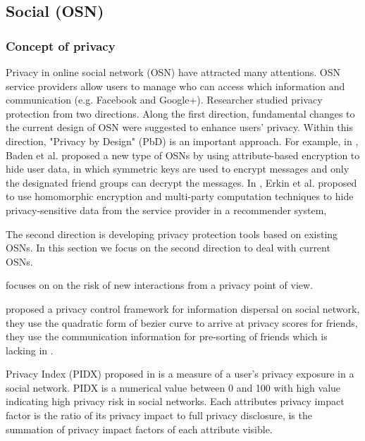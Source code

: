 \subsection{Social (OSN)}

\subsubsection{Concept of privacy}

Privacy in online social network (OSN) have attracted many attentions.
OSN service providers allow users to manage who can access which information and communication (e.g. Facebook and Google+).
Researcher studied privacy protection from two directions.
Along the first direction,
	fundamental changes to the current design of OSN were suggested to enhance users' privacy.
Within this direction, "Privacy by Design" (PbD) is an important approach.
For example,
	in \cite{baden_persona:_2009},
	Baden et al. proposed a new type of OSNs by using attribute-based encryption to hide user data,
	in which symmetric keys are used to encrypt messages and only the designated friend groups can decrypt the messages.
In \cite{erkin_generating_2011},
	Erkin et al. proposed to use homomorphic encryption and multi-party computation techniques to hide privacy-sensitive data from the service provider in a recommender system, 

The second direction is developing privacy protection tools based on existing OSNs.
In this section we focus on the second direction to deal with current OSNs.

\cite{akcora_profiling_2014} focuses on on the risk of new interactions from a privacy point of view.

\cite{b.s._privacy_2015} proposed a privacy control framework for information dispersal on social network,
	they use the quadratic form of bezier curve to arrive at privacy scores for friends,
	they use the communication information for pre-sorting of friends which is lacking in \cite{vidyalakshmi_privacy_2015}.

Privacy Index (PIDX) proposed in \cite{nepali_sonet:_2013} is a measure of a user’s privacy exposure in a social network.
PIDX is a numerical value between 0 and 100 with high value indicating high privacy risk in social networks.
Each attributes privacy impact factor is the ratio of its privacy impact to full privacy disclosure,
	is the summation of privacy impact factors of each attribute visible.

